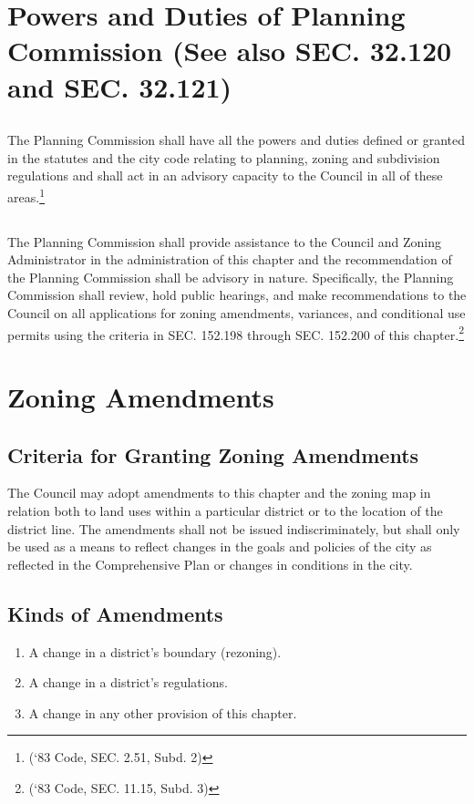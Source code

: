 \section{Powers and Duties of Planning Commission (See also SEC. 32.120 and SEC. 32.121)}
\subsection{}
The Planning Commission shall have all the powers and duties defined or granted in the statutes and the city code relating to planning, zoning and subdivision regulations and shall act in an advisory capacity to the Council in all of these areas.\footnote{(‘83 Code, SEC. 2.51, Subd. 2)}
\subsection{}
The Planning Commission shall provide assistance to the Council and Zoning Administrator in the administration of this chapter and the recommendation of the Planning Commission shall be advisory in nature. Specifically, the Planning Commission shall review, hold public hearings, and make recommendations to the Council on all applications for zoning amendments, variances, and conditional use permits using the criteria in SEC. 152.198 through SEC. 152.200 of this chapter.\footnote{(‘83 Code, SEC. 11.15, Subd. 3)}

\section{Zoning Amendments}
\subsection{Criteria for Granting Zoning Amendments}
The Council may adopt amendments to this chapter and the zoning map in relation both to land uses within a particular district or to the location of the district line. The amendments shall not be issued indiscriminately, but shall only be used as a means to reflect changes in the goals and policies of the city as reflected in the Comprehensive Plan or changes in conditions in the city.
\subsection{Kinds of Amendments}
\begin{enumerate}[{\indent}1)]
    \item A change in a district’s boundary (rezoning).
    \item A change in a district’s regulations.
    \item A change in any other provision of this chapter.
\end{enumerate}
